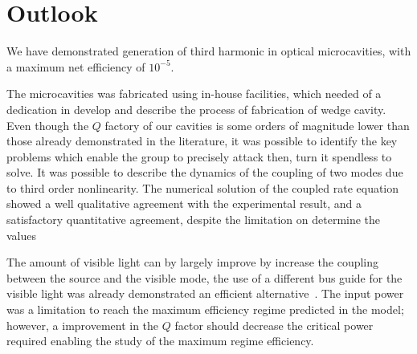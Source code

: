 \chapter{Outlook}

We have demonstrated generation of third harmonic in optical microcavities, with a maximum net efficiency of $10^{-5}$. 

The microcavities was fabricated using in-house facilities, which needed of a dedication in develop and describe the process of fabrication of wedge cavity. Even though the $Q$ factory of our cavities is some orders of magnitude lower than those already demonstrated in the literature, it was possible to identify the key problems which enable the group to precisely attack then, turn it spendless to solve. It was possible to describe the dynamics of the coupling of two modes due to third order nonlinearity. The numerical solution of the coupled rate equation showed a well qualitative agreement with the experimental result, and a satisfactory quantitative agreement, despite the limitation on determine the values  

The amount of visible light can by largely improve by increase the coupling between the source and the visible mode, the use of a different bus guide for the visible light was already demonstrated an efficient alternative~\needcit. The input power was a limitation to reach the maximum efficiency regime predicted in the model; however, a improvement in the $Q$ factor should decrease the critical power required enabling the study of the maximum regime efficiency. 
